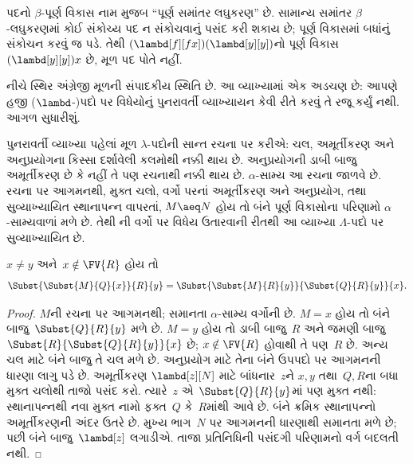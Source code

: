 પદનો $\beta$-પૂર્ણ વિકાસ નામ મુજબ ``પૂર્ણ સમાંતર
લઘુકરણ'' છે. સામાન્ય સમાંતર $\beta$-લઘુકરણમાં કોઈ
સંકોચ્ય પદ ન સંકોચવાનું પસંદ કરી શકાય છે; પૂર્ણ વિકાસમાં
બધાંનું સંકોચન કરવું જ પડે. તેથી
$(\lambd[f][fx])(\lambd[y][y])$નો પૂર્ણ વિકાસ
$(\lambd[y][y])x$ છે, મૂળ પદ પોતે નહીં.

\begin{editorial}
  નીચે સ્થિર અંગ્રેજી મૂળની સંપાદકીય સ્થિતિ છે.
  આ વ્યાખ્યામાં એક અડચણ છે: આપણે હજી
  ($\lambd$-)પદો પર વિધેયોનું પુનરાવર્તી વ્યાખ્યાયન
  કેવી રીતે કરવું તે રજૂ કર્યું નથી. આગળ સુધારીશું.
\end{editorial}

પુનરાવર્તી વ્યાખ્યા પહેલાં મૂળ $\lambda$-પદોની સાન્ત
રચના પર કરીએ: ચલ, અમૂર્તીકરણ અને અનુપ્રયોગના કિસ્સા
દર્શાવેલી કલમોથી નક્કી થાય છે. અનુપ્રયોગની ડાબી બાજુ
અમૂર્તીકરણ છે કે નહીં તે પણ રચનાથી નક્કી થાય છે.
$\alpha$-સામ્ય આ રચના જાળવે છે. રચના પર આગમનથી,
મુક્ત ચલો, વર્ગો પરનાં અમૂર્તીકરણ અને અનુપ્રયોગ, તથા
સુવ્યાખ્યાયિત સ્થાનાપન્ન વાપરતાં,
$M\aeq N$ હોય તો બંને પૂર્ણ વિકાસોના પરિણામો
$\alpha$-સામ્યવાળાં મળે છે. તેથી
ની વર્ગો પર વિધેય ઉતારવાની રીતથી
આ વ્યાખ્યા $\Lambda$-પદો પર સુવ્યાખ્યાયિત છે.

\begin{lem}
  $x\neq y$ અને~$x\notin\FV{R}$ હોય તો
  \[
  \Subst{\Subst{M}{Q}{x}}{R}{y}
  =
  \Subst{\Subst{M}{R}{y}}{\Subst{Q}{R}{y}}{x}.
  \]
\end{lem}
\begin{proof}
  $M$ની રચના પર આગમનથી; સમાનતા $\alpha$-સામ્ય વર્ગોની છે.
  $M=x$ હોય તો બંને બાજુ~$\Subst{Q}{R}{y}$ મળે છે.
  $M=y$ હોય તો ડાબી બાજુ~$R$ અને જમણી બાજુ
  $\Subst{R}{\Subst{Q}{R}{y}}{x}$ છે; $x\notin\FV{R}$
  હોવાથી તે પણ~$R$ છે. અન્ય ચલ માટે બંને બાજુ તે ચલ મળે છે.
  અનુપ્રયોગ માટે તેના બંને ઉપપદો પર આગમનની ધારણા લાગુ પડે છે.
  અમૂર્તીકરણ $\lambd[z][N]$ માટે બાંધનાર~$z$ને
  $x,y$ તથા~$Q,R$ના બધા મુક્ત ચલોથી તાજો પસંદ કરો.
  ત્યારે~$z$ એ~$\Subst{Q}{R}{y}$માં પણ મુક્ત નથી:
  સ્થાનાપન્નથી નવા મુક્ત નામો ફક્ત~$Q$ કે~$R$માંથી આવે છે.
  બંને ક્રમિક સ્થાનાપન્નો અમૂર્તીકરણની અંદર ઉતરે છે.
  મુખ્ય ભાગ~$N$ પર આગમનની ધારણાથી સમાનતા મળે છે;
  પછી બંને બાજુ~$\lambd[z]$ લગાડીએ.
  તાજા પ્રતિનિધિની પસંદગી પરિણામનો વર્ગ બદલતી નથી.
\end{proof}


